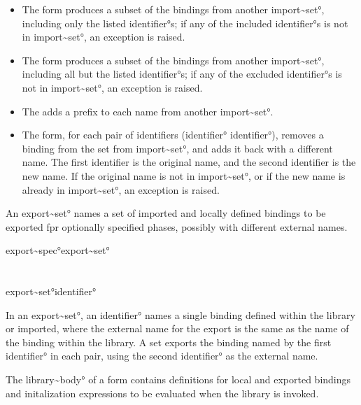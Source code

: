 \documentclass{monograph}
\begin{document}
\begin{itemize}
\item The  form produces a subset of the bindings from another
\ang{import~set}, including only the listed
\ang{identifier}s; if any of the included \ang{identifier}s is not in
\ang{import~set}, an exception is raised.
\item The  form produces a subset of the bindings from another
\ang{import~set}, including all but the listed
\ang{identifier}s; if any of the excluded \ang{identifier}s is not in
\ang{import~set}, an exception is raised.
\item The  adds a prefix to each
name from another \ang{import~set}.
\item The  form, for each pair of identifiers (\ang{identifier}
\ang{identifier}), removes a binding from the set from \ang{import~set},
and adds it back with a different name. 
The first identifier is the original name, and the
second identifier is the new name. 
If the original name is not in \ang{import~set}, or
if the new name is already in \ang{import~set}, an exception is raised.
\end{itemize}

An \ang{export~set} names a set of imported and locally defined bindings to
be exported fpr optionally specified phases, possibly with different
external names.

\begin{grammar}
\ang{export~spec}\longis \ang{export~set}\\
  \orbar {}\\
\\
\ang{export~set}\longis \ang{identifier}\\
  \orbar {}
\end{grammar}

In an \ang{export~set}, an \ang{identifier} names a single binding defined
within the library or imported, where the external name for the export is
the same as the name of the binding within the library. 
A  set exports the binding named by the first
\ang{identifier} in each pair, using the second \ang{identifier} as the
external name.

The \ang{library~body} of a  form contains definitions for
local and exported bindings and initalization expressions to be evaluated
when the library is invoked.
\end{document}
